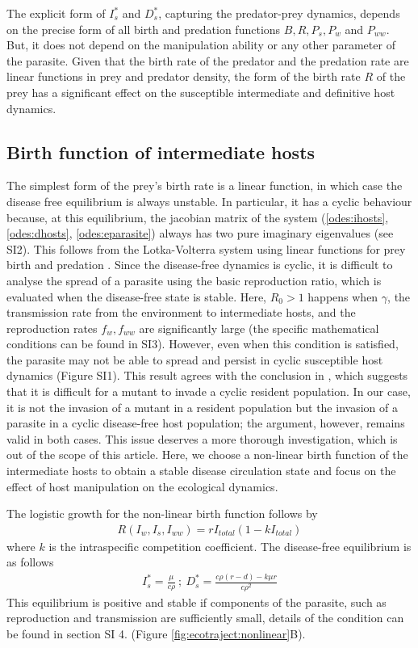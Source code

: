 \documentclass[a4paper]{scrartcl}
\begin{document}
The explicit form of $I_s^*$ and $D_s^*$, capturing the predator-prey dynamics, depends on the precise form of all birth and predation functions $B, R, P_s, P_w$ and $P_{ww}$.
But, it does not depend on the manipulation ability or any other parameter of the parasite. 
Given that the birth rate of the predator and the predation rate are linear functions in prey and predator density, the form of the birth rate $R$ of the prey has a significant effect on the susceptible intermediate and definitive host dynamics.

\subsection*{Birth function of intermediate hosts}

The simplest form of the prey's birth rate is a linear function, in which case the disease free equilibrium is always unstable. In particular, it has a cyclic behaviour because, at this equilibrium, the jacobian matrix of the system (\ref{odes:ihosts}, \ref{odes:dhosts}, \ref{odes:eparasite}) always has two pure imaginary eigenvalues (see SI2). 
This follows from the Lotka-Volterra system using linear functions for prey birth and predation \citep{Lotka1920}.
Since the disease-free dynamics is cyclic, it is difficult to analyse the spread of a parasite using the basic reproduction ratio, which is evaluated when the disease-free state is stable. 
Here,  $R_0 > 1$  happens when $\gamma$, the transmission rate from the environment to intermediate hosts, and the reproduction rates $f_w, f_{ww}$ are significantly large (the specific mathematical conditions can be found in SI3). 
However, even when this condition is satisfied, the parasite may not be able to spread and persist in cyclic susceptible host dynamics (Figure SI1). 
This result agrees with the conclusion in \citep{Ripa:Evol:2013}, which suggests that it is difficult for a mutant to invade a cyclic resident population. 
In our case, it is not the invasion of a mutant in a resident population but the invasion of a parasite in a cyclic disease-free host population; the argument, however, remains valid in both cases. 
This issue deserves a more thorough investigation, which is out of the scope of this article. 
Here, we choose a non-linear birth function of the intermediate hosts to obtain a stable disease circulation state and focus on the effect of host manipulation on the ecological dynamics. 

The logistic growth for the non-linear birth function follows by 
%
\begin{align*}
R(I_w, I_s,I_{ww}) = r I_{total} (1 - k I_{total})
\end{align*}
%
where $k$ is the intraspecific competition coefficient. 
The disease-free equilibrium is as follows
%
\begin{align*}
I_s^* = \frac{\mu}{c \rho } \ ;\  D_s^* = \frac{c \rho  (r-d) - k \mu  r}{c \rho ^2}
\end{align*}
%
This equilibrium is positive and stable if components of the parasite, such as reproduction and transmission are sufficiently small, details of the condition can be found in section SI 4.
(Figure \ref{fig:ecotraject:nonlinear}B).
\end{document}
